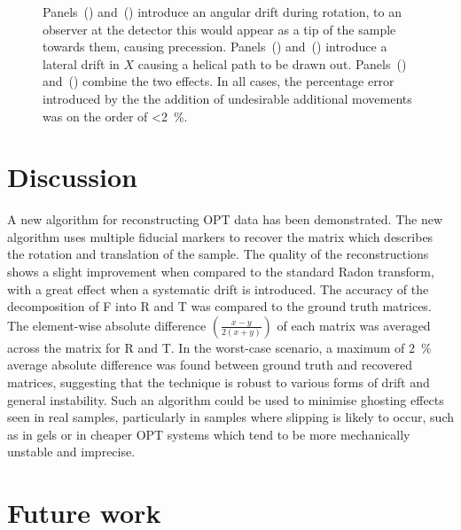 \documentclass{osa-article}
\begin{document}
\begin{figure}
{          Panels~() and~() introduce an angular drift during rotation, to an observer at the detector this would appear as a tip of the sample towards them, causing precession.
          Panels~() and~() introduce a lateral drift in \(X\) causing a helical path to be drawn out.
          Panels~() and~() combine the two effects.
          In all cases, the percentage error introduced by the the addition of undesirable additional movements was on the order of \SI{<2}{\percent}.
          }\label{fig:pc_sum_decompose}
\end{figure}

\section*{Discussion}

A new algorithm for reconstructing OPT data has been demonstrated.
The new algorithm uses multiple fiducial markers to recover the matrix which describes the rotation and translation of the sample.
The quality of the reconstructions shows a slight improvement when compared to the standard Radon transform, with a great effect when a systematic drift is introduced.
The accuracy of the decomposition of \gls*{F} into \gls*{R} and \gls*{T} was compared to the ground truth matrices.
The element-wise absolute difference \(\left(\frac{x-y}{2(x+y)}\right)\) of each matrix was averaged across the matrix for \gls*{R} and \gls*{T}.
In the worst-case scenario, a maximum of \SI{2}{\percent} average absolute difference was found between ground truth and recovered matrices,
suggesting that the technique is robust to various forms of drift and general instability.
Such an algorithm could be used to minimise ghosting effects seen in real samples, particularly in samples where slipping is likely to occur, such as in gels or in cheaper OPT systems which tend to be more mechanically unstable and imprecise.

\section*{Future work}
\end{document}
